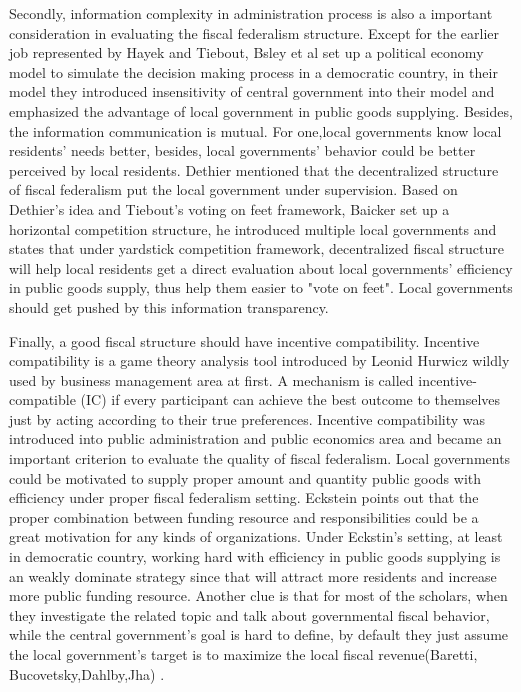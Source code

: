 Secondly, information complexity in administration process is also a important consideration in evaluating the fiscal federalism structure. Except for the earlier job represented by Hayek and Tiebout, Bsley et al \cite{2003Centralized} set up a political economy model to simulate the decision making process in a democratic country, in their model they introduced insensitivity of central government into their model and emphasized the advantage of local government in public goods supplying. Besides, the information communication is mutual. For one,local governments know local residents' needs better, besides, local governments' behavior could be better perceived by local residents. Dethier \cite{martinez2003fiscal} mentioned that the decentralized structure of fiscal federalism put the local government under supervision. Based on Dethier's idea and Tiebout's voting on feet framework, Baicker \cite{baicker2005spillover} set up a horizontal competition structure, he introduced multiple local governments and states that under yardstick competition framework, decentralized fiscal structure will help local residents get a direct evaluation about  local governments' efficiency in public goods supply, thus help them easier to "vote on feet". Local governments should get pushed by this information transparency.

Finally, a good fiscal structure should have incentive compatibility. Incentive compatibility is a game theory analysis tool introduced by Leonid Hurwicz \cite{hurwicz1973design} wildly used by business management area at first. A mechanism is called incentive-compatible (IC) if every participant can achieve the best outcome to themselves just by acting according to their true preferences. Incentive compatibility was introduced into public administration and public economics area and became an important criterion to evaluate the quality of fiscal federalism. Local governments could be motivated to supply proper amount and quantity public goods with efficiency under proper fiscal federalism setting. Eckstein \cite{eckstein1958water} points out that the proper combination between funding resource and responsibilities could be a great motivation for any kinds of organizations. Under Eckstin's setting, at least in democratic country, working hard with efficiency in public goods supplying is an weakly dominate strategy since that will attract more residents and increase more public funding resource. Another clue is that for most of the scholars, when they  investigate the related topic and talk about governmental fiscal behavior, while the central government's goal is hard to define, by default they just assume the local government's target is to maximize the local fiscal revenue(Baretti, Bucovetsky,Dahlby,Jha) \cite{baretti2002tax,bucovetsky2006efficiency,dahlby2011marginal,jha2000tax}.

